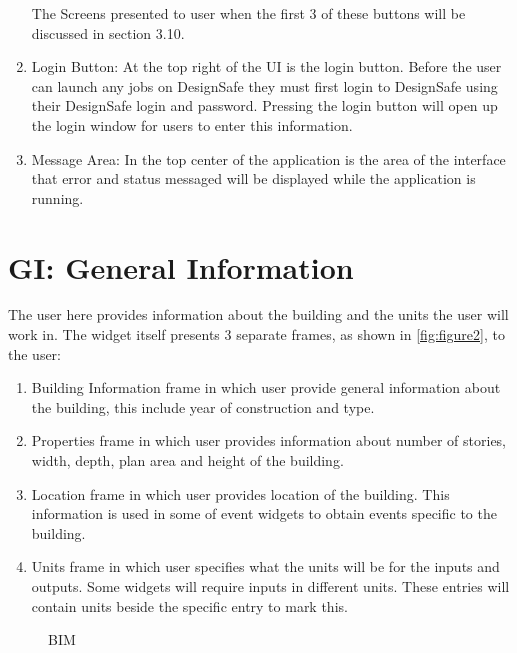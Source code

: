 \begin{enumerate}
The Screens presented to user when the first 3 of these buttons will be discussed in section 3.10.

\item Login Button: At the top right of the UI is the login button. Before the user can launch any jobs on DesignSafe they must first login to DesignSafe using their DesignSafe login and password. Pressing the login button will open up the login window for users to enter this information.

\item Message Area: In the top center of the application is the area of the interface that error and status messaged will be displayed while the application is running.

\end{enumerate}

\section{GI: General Information}
The user here provides information about the building and the units the user will work in. The widget itself presents 3 separate frames, as shown in \autoref{fig:figure2}, to the user:

\begin{enumerate}
\item Building Information frame in which user provide general information about the building, this include year of construction and type.
\item Properties frame in which user provides information about number of stories, width, depth, plan area and height of the building.
\item Location frame in which user provides location of the building. This information is used in some of event widgets to obtain events specific to the building.
\item Units frame  in which user specifies what the units will be for the inputs and outputs. Some widgets will require inputs in different units. These entries will contain units beside the specific entry to mark this.
\end{enumerate}


\begin{figure}[!htbp]
  \caption{BIM}
  \label{fig:figure2}
\end{figure}

